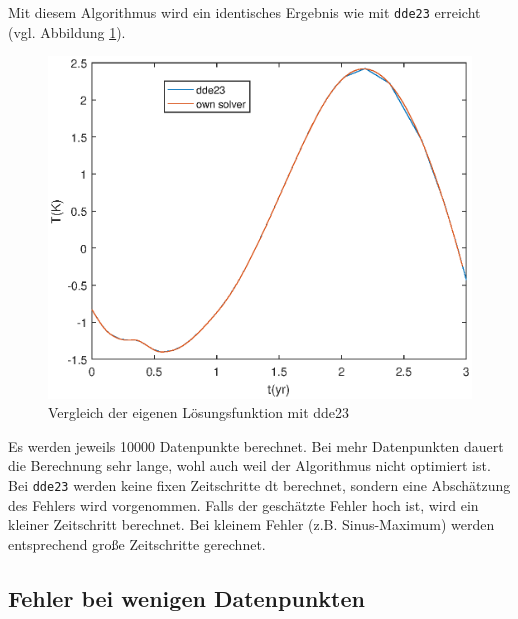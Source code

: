 Mit diesem Algorithmus wird ein identisches Ergebnis wie mit \texttt{dde23} erreicht (vgl. Abbildung \ref{fig:vgl_dde23}). 
\begin{figure}
	\centering
	\includegraphics{verzoegert/inp/figures/vgl_dde23.eps}
	\caption{Vergleich der eigenen Lösungsfunktion mit dde23}
	\label{fig:vgl_dde23}
\end{figure}
Es werden jeweils 10000 Datenpunkte berechnet. 
Bei mehr Datenpunkten dauert die Berechnung sehr lange, wohl auch weil der Algorithmus nicht optimiert ist.
Bei \texttt{dde23} werden keine fixen Zeitschritte dt berechnet, sondern eine Abschätzung des Fehlers wird vorgenommen.
Falls der geschätzte Fehler hoch ist, wird ein kleiner Zeitschritt berechnet. 
Bei kleinem Fehler (z.B. Sinus-Maximum) werden entsprechend große Zeitschritte gerechnet.

\subsection{Fehler bei wenigen Datenpunkten}
